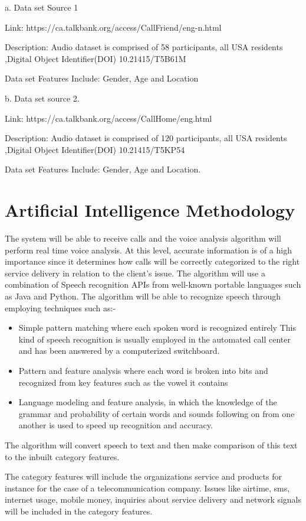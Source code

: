 \documentclass[conference]{IEEEtran}
\begin{document}
a. Data set Source 1

Link: https://ca.talkbank.org/access/CallFriend/eng-n.html

Description: Audio dataset  is comprised of 58 participants, all USA residents ,Digital Object Identifier(DOI) 10.21415/T5B61M

Data set Features Include: Gender, Age and Location

b. Data set source 2.

Link: https://ca.talkbank.org/access/CallHome/eng.html

Description: Audio dataset  is comprised of 120 participants, all USA residents ,Digital Object Identifier(DOI) 10.21415/T5KP54

Data set Features Include: Gender, Age and Location.

\section{Artificial Intelligence Methodology}
The system will be able to receive calls and the voice analysis algorithm will perform real time voice analysis. At this level, accurate information is of a high importance since it determines how calls will be correctly categorized to the right service delivery in relation to the client’s issue. The algorithm will use a combination of Speech recognition APIs from well-known portable languages such as Java and Python. The algorithm will be able to recognize speech through employing techniques such as:-
\begin{itemize}
\item Simple pattern matching where each spoken word is recognized entirely
This kind of speech recognition is usually employed in the automated call center and has been answered by a computerized switchboard.
\item 	Pattern and feature analysis where each word is broken into bits and recognized from key features such as the vowel it contains
\item Language modeling and feature analysis, in which the knowledge of the grammar and probability of certain words and sounds following on from one another is used to speed up recognition and accuracy.
\end{itemize}
The algorithm will convert speech to text and then make comparison of this text to the inbuilt category features.

The category features will include the organizations service and products for instance for the case of a telecommunication company. Issues like airtime, sms, internet usage, mobile money, inquiries about service delivery and network signals will be included in the category features.
\end{document}
